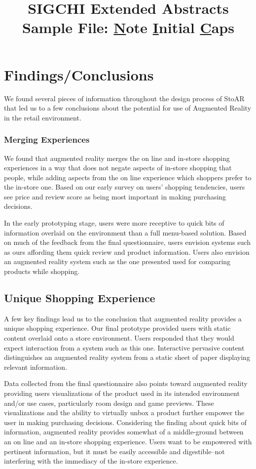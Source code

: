 \documentclass{sigchi-ext}
\begin{document}
\title{SIGCHI Extended Abstracts Sample File: \underline{N}ote
  \underline{I}nitial \underline{C}aps}

\section{Findings/Conclusions}

We found several pieces of information throughout the design process of StoAR that led us to a few conclusions about the potential for use of Augmented Reality in the retail environment.

\subsubsection{Merging Experiences}
We found that augmented reality merges the on line and in-store shopping experiences in a way that does not negate aspects of in-store shopping that people, while adding aspects from the on line experience which shoppers prefer to the in-store one.  Based on our early survey on users' shopping tendencies, users see price and review score as being most important in making purchasing decisions.

In the early prototyping stage, users were more receptive to quick bits of information overlaid on the environment than a full menu-based solution.  Based on much of the feedback from the final questionnaire, users envision systems such as ours affording them quick review and product information.  Users also envision an augmented reality system such as the one presented used for comparing products while shopping.

\subsection{Unique Shopping Experience}
A few key findings lead us to the conclusion that augmented reality provides a unique shopping experience.  
Our final prototype provided users with static content overlaid onto a store environment.  Users responded that they would expect interaction from a system such as this one.  Interactive pervasive content distinguishes an augmented reality system from a static sheet of paper displaying relevant information.

Data collected from the final questionnaire also points toward augmented reality providing users visualizations of the product used in its intended environment and/or use cases, particularly room design and game previews.  These visualizations and the ability to virtually unbox a product further empower the user in making purchasing decisions.
Considering the finding about quick bits of information, augmented reality provides somewhat of a middle-ground between an on line and an in-store shopping experience.  Users want to be empowered with pertinent information, but it must be easily accessible and digestible--not interfering with the immediacy of the in-store experience.
\end{document}
